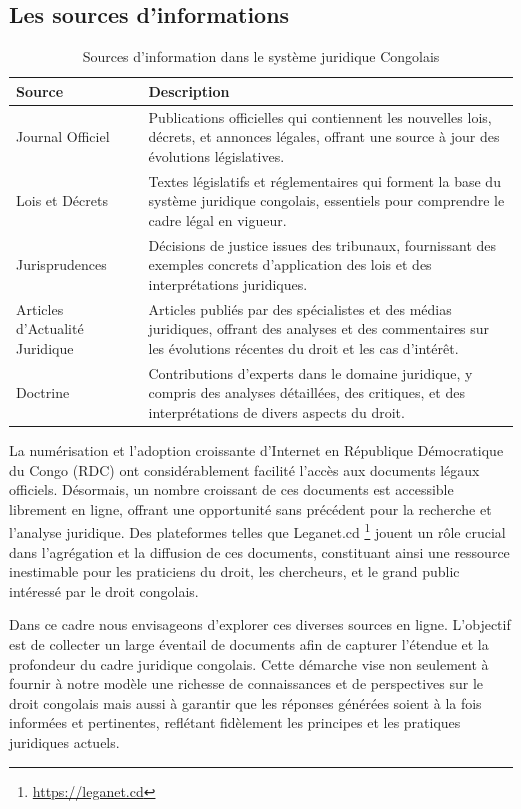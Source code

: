 \subsection{Les sources d'informations}

\begin{table}[h]
\centering
\begin{tabular}{|l|p{10cm}|}
    \hline
    \textbf{Source} & \textbf{Description} \\
    \hline
    Journal Officiel & Publications officielles qui contiennent les nouvelles lois, décrets, et annonces légales, offrant une source à jour des évolutions législatives. \\
    \hline
    Lois et Décrets & Textes législatifs et réglementaires qui forment la base du système juridique congolais, essentiels pour comprendre le cadre légal en vigueur. \\
    \hline
    Jurisprudences & Décisions de justice issues des tribunaux, fournissant des exemples concrets d’application des lois et des interprétations juridiques. \\
    \hline
    Articles d’Actualité Juridique & Articles publiés par des spécialistes et des médias juridiques, offrant des analyses et des commentaires sur les évolutions récentes du droit et les cas d’intérêt. \\
    \hline
    Doctrine & Contributions d’experts dans le domaine juridique, y compris des analyses détaillées, des critiques, et des interprétations de divers aspects du droit. \\
    \hline
\end{tabular}
\caption{Sources d'information dans le système juridique Congolais}
\label{table:sources-legales-congo}
\end{table}

La numérisation et l'adoption croissante d'Internet en République Démocratique du Congo (RDC) ont considérablement facilité l'accès aux documents légaux officiels. Désormais, un nombre croissant de ces documents est accessible librement en ligne, offrant une opportunité sans précédent pour la recherche et l'analyse juridique. Des plateformes telles que Leganet.cd \footnote{\href{https://leganet.cd}{https://leganet.cd}} jouent un rôle crucial dans l'agrégation et la diffusion de ces documents, constituant ainsi une ressource inestimable pour les praticiens du droit, les chercheurs, et le grand public intéressé par le droit congolais.

Dans ce cadre nous envisageons d'explorer ces diverses sources en ligne. L'objectif est de collecter un large éventail de documents afin de capturer l'étendue et la profondeur du cadre juridique congolais. Cette démarche vise non seulement à fournir à notre modèle une richesse de connaissances et de perspectives sur le droit congolais mais aussi à garantir que les réponses générées soient à la fois informées et pertinentes, reflétant fidèlement les principes et les pratiques juridiques actuels.

